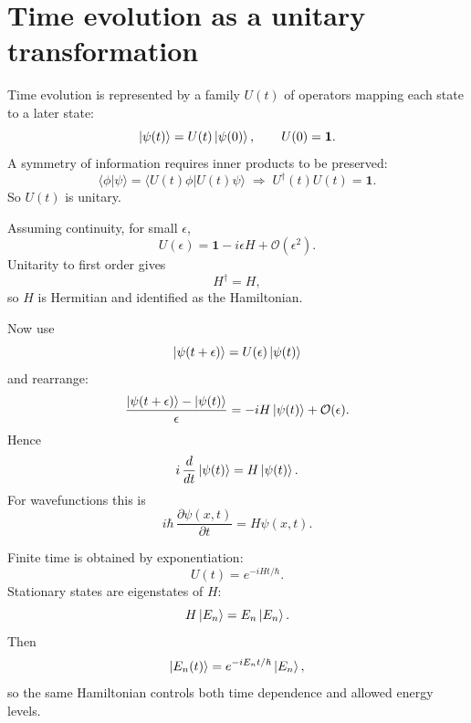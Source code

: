 \section{Time evolution as a unitary transformation}

Time evolution is represented by a family \(U(t)\) of operators mapping each state to a later state:
\begin{equation}
\left\lvert\psi(t)\right\rangle = U(t)\left\lvert\psi(0)\right\rangle,\qquad U(0)=\mathbf 1.
\end{equation}
A symmetry of information requires inner products to be preserved:
\begin{equation}
\langle\phi|\psi\rangle=\langle U(t)\phi|U(t)\psi\rangle
\;\Longrightarrow\; U^\dagger(t)U(t)=\mathbf 1.
\end{equation}
So \(U(t)\) is unitary.

Assuming continuity, for small \(\epsilon\),
\begin{equation}
U(\epsilon)=\mathbf 1-i\epsilon H+\mathcal O(\epsilon^2).
\end{equation}
Unitarity to first order gives
\begin{equation}
H^\dagger=H,
\end{equation}
so \(H\) is Hermitian and identified as the Hamiltonian.

Now use
\begin{equation}
\left\lvert\psi(t+\epsilon)\right\rangle=U(\epsilon)\left\lvert\psi(t)\right\rangle
\end{equation}
and rearrange:
\begin{equation}
\frac{\left\lvert\psi(t+\epsilon)\right\rangle-\left\lvert\psi(t)\right\rangle}{\epsilon}
=-iH\left\lvert\psi(t)\right\rangle+\mathcal O(\epsilon).
\end{equation}
Hence
\begin{equation}
i\,\frac{d}{dt}\left\lvert\psi(t)\right\rangle=H\left\lvert\psi(t)\right\rangle.
\end{equation}
For wavefunctions this is
\begin{equation}
i\hbar\,\frac{\partial \psi(x,t)}{\partial t}=H\psi(x,t).
\end{equation}

Finite time is obtained by exponentiation:
\begin{equation}
U(t)=e^{-iHt/\hbar}.
\end{equation}
Stationary states are eigenstates of \(H\):
\begin{equation}
H\left\lvert E_n\right\rangle=E_n\left\lvert E_n\right\rangle.
\end{equation}
Then
\begin{equation}
\left\lvert E_n(t)\right\rangle=e^{-iE_n t/\hbar}\left\lvert E_n\right\rangle,
\end{equation}
so the same Hamiltonian controls both time dependence and allowed energy levels.

